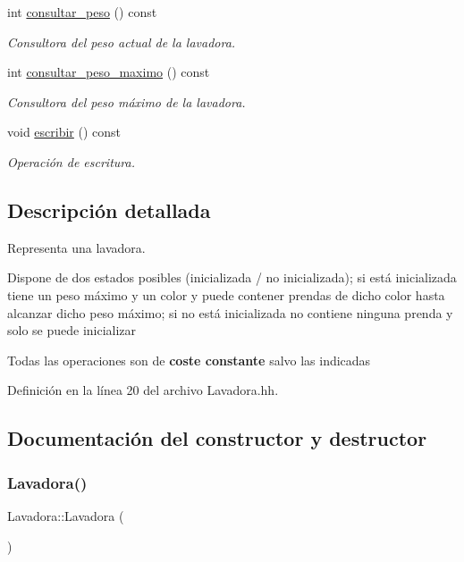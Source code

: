 \begin{DoxyCompactItemize}
int \hyperlink{class_lavadora_a411751a432a84ab91196e6b827190f05}{consultar\+\_\+peso} () const
\begin{DoxyCompactList}\small\item\em Consultora del peso actual de la lavadora. \end{DoxyCompactList}\item 
int \hyperlink{class_lavadora_a725ef6a2786b400e0cffebe7a690602e}{consultar\+\_\+peso\+\_\+maximo} () const
\begin{DoxyCompactList}\small\item\em Consultora del peso máximo de la lavadora. \end{DoxyCompactList}\item 
void \hyperlink{class_lavadora_a2372c33a5f76dda6e3892d118ae726f1}{escribir} () const
\begin{DoxyCompactList}\small\item\em Operación de escritura. \end{DoxyCompactList}\end{DoxyCompactItemize}


\subsection{Descripción detallada}
Representa una lavadora. 

Dispone de dos estados posibles (inicializada / no inicializada); si está inicializada tiene un peso máximo y un color y puede contener prendas de dicho color hasta alcanzar dicho peso máximo; si no está inicializada no contiene ninguna prenda y solo se puede inicializar

Todas las operaciones son de {\bfseries coste constante} salvo las indicadas 

Definición en la línea 20 del archivo Lavadora.\+hh.



\subsection{Documentación del constructor y destructor}
\mbox{\label{class_lavadora_a2366b1cd0ba86f8ef8ba8504067dc114}} 
\subsubsection{\texorpdfstring{Lavadora()}{Lavadora()}}
{\footnotesize\ttfamily Lavadora\+::\+Lavadora (\begin{DoxyParamCaption}{ }\end{DoxyParamCaption})}



